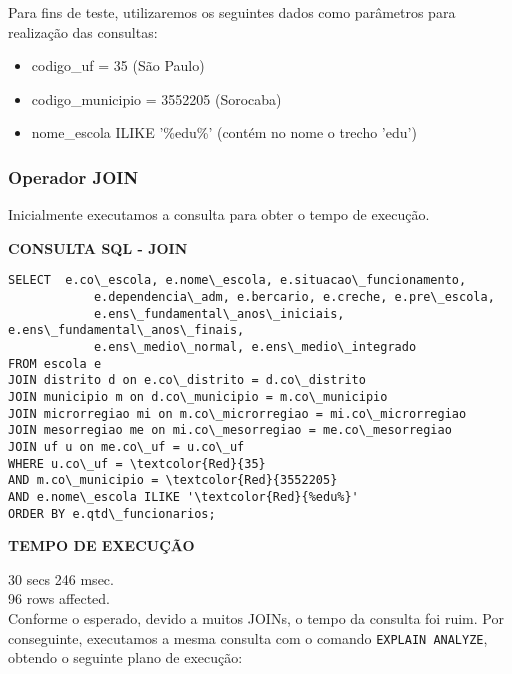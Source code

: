 \documentclass[12pt,a4paper]{article}
\begin{document}
Para fins de teste, utilizaremos os seguintes dados como parâmetros para realização das consultas: 
\begin{itemize}
    \item codigo\_uf = 35 (São Paulo)
    \item codigo\_municipio = 3552205 (Sorocaba)
    \item nome\_escola ILIKE '\%edu\%' (contém no nome o trecho 'edu')
\end{itemize}

\subsubsection{Operador JOIN}

Inicialmente executamos a consulta para obter o tempo de execução.

\vspace{0.5cm}

\begin{flushleft}
\textbf{CONSULTA SQL - JOIN}\\
\end{flushleft}

\begin{Verbatim}[commandchars=\\\{\}]
SELECT  e.co\_escola, e.nome\_escola, e.situacao\_funcionamento,
            e.dependencia\_adm, e.bercario, e.creche, e.pre\_escola,
            e.ens\_fundamental\_anos\_iniciais, e.ens\_fundamental\_anos\_finais,
            e.ens\_medio\_normal, e.ens\_medio\_integrado
FROM escola e
JOIN distrito d on e.co\_distrito = d.co\_distrito
JOIN municipio m on d.co\_municipio = m.co\_municipio
JOIN microrregiao mi on m.co\_microrregiao = mi.co\_microrregiao
JOIN mesorregiao me on mi.co\_mesorregiao = me.co\_mesorregiao
JOIN uf u on me.co\_uf = u.co\_uf
WHERE u.co\_uf = \textcolor{Red}{35}
AND m.co\_municipio = \textcolor{Red}{3552205}
AND e.nome\_escola ILIKE '\textcolor{Red}{%edu%}'
ORDER BY e.qtd\_funcionarios;
\end{Verbatim}

\begin{flushleft}
\textbf{TEMPO DE EXECUÇÃO}\\
\end{flushleft}
30 secs 246 msec.\\
96 rows affected.\\

Conforme o esperado, devido a muitos JOINs, o tempo da consulta foi ruim. Por conseguinte, executamos a mesma consulta com o comando \texttt{EXPLAIN ANALYZE}, obtendo o seguinte plano de execução:
\end{document}
